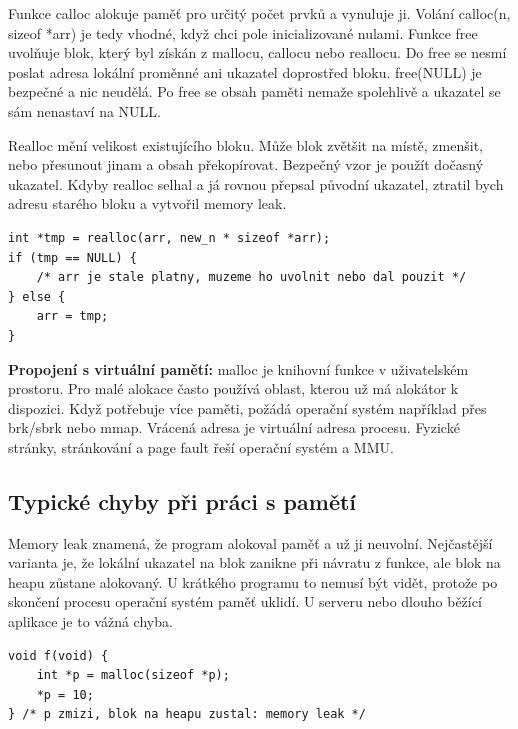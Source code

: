 \documentclass[11pt,a4paper]{article}
\newcommand{\itbox}[1]{\medskip\noindent\colorbox{black!6}{\parbox{\dimexpr\linewidth-2\fboxsep}{#1}}\medskip}
\begin{document}
Funkce calloc alokuje paměť pro určitý počet prvků a vynuluje ji. Volání calloc(n, sizeof *arr) je tedy vhodné, když chci pole inicializované nulami. Funkce free uvolňuje blok, který byl získán z mallocu, callocu nebo reallocu. Do free se nesmí poslat adresa lokální proměnné ani ukazatel doprostřed bloku. free(NULL) je bezpečné a nic neudělá. Po free se obsah paměti nemaže spolehlivě a ukazatel se sám nenastaví na NULL.

Realloc mění velikost existujícího bloku. Může blok zvětšit na místě, zmenšit, nebo přesunout jinam a obsah překopírovat. Bezpečný vzor je použít dočasný ukazatel. Kdyby realloc selhal a já rovnou přepsal původní ukazatel, ztratil bych adresu starého bloku a vytvořil memory leak.

\begin{codebox}
\small
\begin{verbatim}
int *tmp = realloc(arr, new_n * sizeof *arr);
if (tmp == NULL) {
    /* arr je stale platny, muzeme ho uvolnit nebo dal pouzit */
} else {
    arr = tmp;
}
\end{verbatim}
\end{codebox}

\itbox{\textbf{Propojení s virtuální pamětí:} malloc je knihovní funkce v uživatelském prostoru. Pro malé alokace často používá oblast, kterou už má alokátor k dispozici. Když potřebuje více paměti, požádá operační systém například přes brk/sbrk nebo mmap. Vrácená adresa je virtuální adresa procesu. Fyzické stránky, stránkování a page fault řeší operační systém a MMU.}

\subsection*{Typické chyby při práci s pamětí}

Memory leak znamená, že program alokoval paměť a už ji neuvolní. Nejčastější varianta je, že lokální ukazatel na blok zanikne při návratu z funkce, ale blok na heapu zůstane alokovaný. U krátkého programu to nemusí být vidět, protože po skončení procesu operační systém paměť uklidí. U serveru nebo dlouho běžící aplikace je to vážná chyba.

\begin{codebox}
\small
\begin{verbatim}
void f(void) {
    int *p = malloc(sizeof *p);
    *p = 10;
} /* p zmizi, blok na heapu zustal: memory leak */
\end{verbatim}
\end{codebox}
\end{document}
